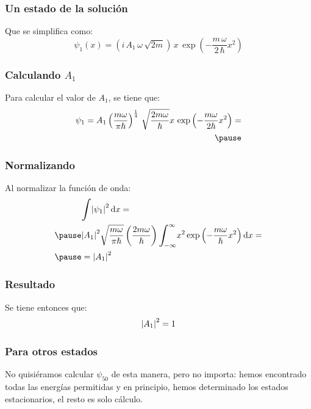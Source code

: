 \documentclass[12pt]{beamer}
\begin{document}
\begin{frame}
\frametitle{Un estado de la solución}
Que se simplifica como:
\pause
\begin{equation}
\psi_{1} (x) = \left( i \, A_{1} \, \omega \, \sqrt{2 m }  \right) \, x \, \exp \left( - \dfrac{m \, \omega}{2 \, \hbar} x^{2} \right)
\label{eq:ecuacion_02_051}
\end{equation}
\end{frame}
\begin{frame}
\frametitle{Calculando $A_{1}$}
Para calcular el valor de $A_{1}$, se tiene que:
\begin{eqnarray*}
\begin{aligned}
\psi_{1} = A_{1} \left( \dfrac{m \omega}{\pi \hbar} \right)^{\frac{1}{4}} \, \sqrt{\dfrac{2 m \omega}{\hbar}}
 x \, \exp \left( - \dfrac{m \omega}{2 \hbar} x^{2} \right) = \\ \pause
 \end{aligned}
\end{eqnarray*}
\end{frame}
\begin{frame}
\frametitle{Normalizando}
Al normalizar la función de onda:
\pause
\begin{eqnarray*}
\begin{aligned}
&\scaleint{6ex} \abs{\psi_{1}}^{2} \dd{x} = \\ \pause
&\abs{A_{1}}^{2} \sqrt{\dfrac{m \omega}{\pi \hbar}} \left( \dfrac{2 m \omega}{\hbar} \right) \scaleint{6ex}_{\bs -\infty}^{\infty} x^{2} \exp\left( - \dfrac{m \omega}{\hbar} x^{2} \right) \dd{x} = \\ \pause
&= \abs{A_{1}}^{2}
\end{aligned}
\end{eqnarray*}

\end{frame}
\begin{frame}
\frametitle{Resultado}
Se tiene entonces que:
\pause
\begin{align*}
\abs{A_{1}}^{2} = 1
\end{align*}
\end{frame}
\begin{frame}
\frametitle{Para otros estados}
No quisiéramos calcular $\psi_{50}$ de esta manera, \pause pero no importa: hemos encontrado todas las energías permitidas y en principio, hemos determinado los estados estacionarios, el resto es solo cálculo.
\end{frame}
\end{document}
